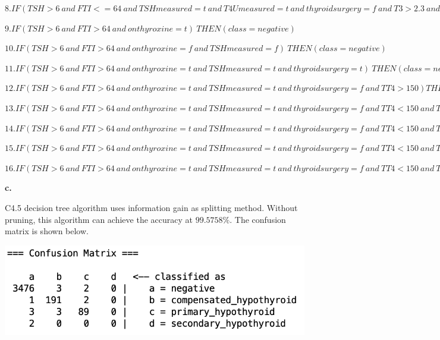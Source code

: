 \documentclass{article}
\begin{document}
$8. IF(TSH>6 \ and \ FTI<=64 \ and \ TSH measured = t \ and \ T4U measured = t \ and \ thyroid surgery = f \ and \ T3>2.3 \ and \ TSH<=15) \ THEN(class=negative)$

$9. IF(TSH>6 \ and \ FTI>64 \ and \ on thyroxine=t) \  THEN(class=negative)$

$10. IF(TSH>6 \ and \ FTI>64 \ and \ on thyroxine=f \ and \ TSH measured=f) \ THEN(class=negative)$

$11. IF(TSH>6 \ and \ FTI>64 \ and \ on thyroxine=t \ and \ TSH measured=t \ and \ thyroid surgery=t) \ THEN(class=negative)$

$12. IF(TSH>6 \ and \ FTI>64 \ and \ on thyroxine=t \ and \ TSH measured=t \ and \ thyroid surgery=f \ and \ TT4>150) THEN(class=negative)$

$13. IF(TSH>6 \ and \ FTI>64 \ and \ on thyroxine=t \ and \ TSH measured=t \ and \ thyroid surgery=f \ and \ TT4<150 \ and \ TT4 measured=f) \ THEN(class=primary \ hypothyroid)$

$14. IF(TSH>6 \ and \ FTI>64 \ and \ on thyroxine=t \ and \ TSH measured=t \ and \ thyroid surgery=f \ and \ TT4<150 \ and \ TT4 measured=t \ and \ TT4>48) \ THEN(class=compensated \ hypothyroid)$

$15. IF(TSH>6 \ and \ FTI>64 \ and \ on thyroxine=t \ and \ TSH measured=t \ and \ thyroid surgery=f \ and \ TT4<150 \ and \ TT4 measured=t \ and \ TT4<=48 \ and \ T4U measure=f) \ THEN(class=primary \ hypothyroid)$

$16. IF(TSH>6 \ and \ FTI>64 \ and \ on thyroxine=t \ and \ TSH measured=t \ and \ thyroid surgery=f \ and \ TT4<150 \ and \ TT4 measured=t \ and \ TT4<=48 \ and \ T4U measure=t) THEN(class=negative)$

\bigskip

\textbf{c.}

C4.5 decision tree algorithm uses information gain as splitting method. Without pruning, this algorithm can achieve the accuracy at $99.5758\%$. The confusion matrix is shown below.

\includegraphics[scale=0.8]{j48_np_confusion_matrix.png}
\end{document}
